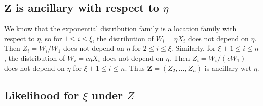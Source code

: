 \documentclass[12pt]{article}
\begin{document}
\subsection{$\bm{Z}$ is ancillary with respect to $\eta$}
We know that the exponential distribution family
is a location family with respect to $\eta$,
so for $1 \leq i \leq \xi$,
the distribution of $W_i = \eta X_i$ does not depend on $\eta$.
Then $Z_i = W_i / W_1$ does not depend on $\eta$
for $2 \leq i \leq \xi$.
Similarly, for $\xi+1 \leq i \leq n$,
the distribution of $W_i = c \eta X_i$ does not depend on $\eta$.
Then $Z_i = W_i / (cW_1)$ does not depend on $\eta$
for $\xi+1 \leq i \leq n$.
Thus $\bm{Z} = (Z_2, \ldots, Z_n)$ is ancillary wrt $\eta$.

\subsection{Likelihood for $\xi$ under $Z$}
\end{document}
